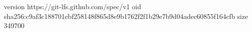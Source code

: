 version https://git-lfs.github.com/spec/v1
oid sha256:c9af3c188701ebf258148f865d8e9b1762f2f1b29e7b9d04adec60855f164cfb
size 349700
